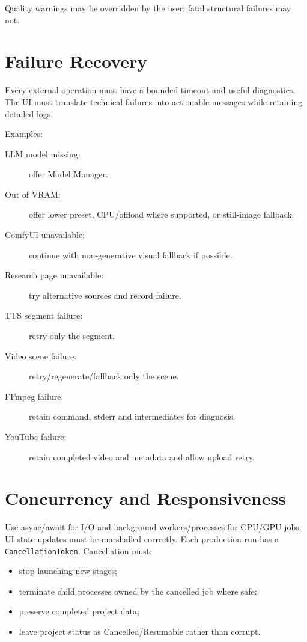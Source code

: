 \documentclass[10pt,journal,compsoc]{IEEEtran}
\begin{document}
Quality warnings may be overridden by the user; fatal structural failures may not.

\section{Failure Recovery}

Every external operation must have a bounded timeout and useful diagnostics. The UI must translate technical failures into actionable messages while retaining detailed logs.

Examples:
\begin{description}
    \item[LLM model missing:] offer Model Manager.
    \item[Out of VRAM:] offer lower preset, CPU/offload where supported, or still-image fallback.
    \item[ComfyUI unavailable:] continue with non-generative visual fallback if possible.
    \item[Research page unavailable:] try alternative sources and record failure.
    \item[TTS segment failure:] retry only the segment.
    \item[Video scene failure:] retry/regenerate/fallback only the scene.
    \item[FFmpeg failure:] retain command, stderr and intermediates for diagnosis.
    \item[YouTube failure:] retain completed video and metadata and allow upload retry.
\end{description}

\section{Concurrency and Responsiveness}

Use async/await for I/O and background workers/processes for CPU/GPU jobs. UI state updates must be marshalled correctly. Each production run has a \texttt{CancellationToken}. Cancellation must:
\begin{itemize}
    \item stop launching new stages;
    \item terminate child processes owned by the cancelled job where safe;
    \item preserve completed project data;
    \item leave project status as Cancelled/Resumable rather than corrupt.
\end{itemize}
\end{document}
